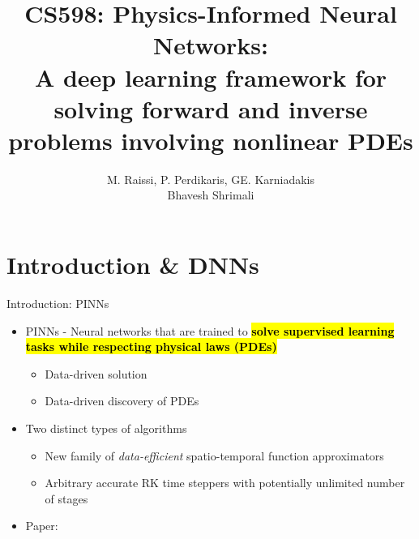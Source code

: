 \documentclass[xcolor=dvipsnames,10pt]{beamer}
\title[PINNs]{\large CS598: Physics-Informed Neural Networks:\\ A deep learning framework for solving forward and inverse problems involving nonlinear PDEs}
\author[M. Raissi, P. Perdikaris, GE. Karniadakis]{M. Raissi, P. Perdikaris, GE. Karniadakis \\[8pt] Bhavesh Shrimali}
\makeatletter
\let\HL\hl
\renewcommand\hl{%
  \let\set@color\beamerorig@set@color
  \let\reset@color\beamerorig@reset@color
  \HL}
\makeatother
\begin{document}
\begin{frame}
    \titlepage
\end{frame}
\section{Introduction \& DNNs}
\begin{frame}[t]{Introduction: PINNs}
  \begin{itemize}
    \item<1-> PINNs - Neural networks that are trained to \hl{\bf solve supervised learning tasks while respecting physical laws (PDEs)}
    \begin{itemize}
      \item<2-> Data-driven solution \cite{raissi2017physicsI} 
      \item<3-> Data-driven discovery of PDEs \cite{raissi2017physicsII}
    \end{itemize}
    \item<4-> Two distinct types of algorithms
    \begin{itemize}
      \item<5-> New family of \emph{data-efficient} spatio-temporal function approximators 
      \item<6-> Arbitrary accurate RK time steppers with potentially unlimited number of stages
    \end{itemize}
    \item<7-> Paper: \cite{raissi2019physics}
  \end{itemize}
\end{frame}
\end{document}
